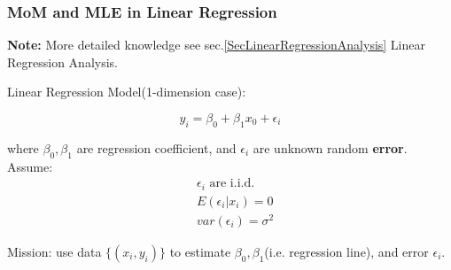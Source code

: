 \subsubsection{MoM and MLE in Linear Regression}\label{SubSectionMoM_MLE_LinearRegression}
    \textbf{Note:} More detailed knowledge see sec.\ref{SecLinearRegressionAnalysis} Linear Regression Analysis.

\begin{point}
    Linear Regression Model(1-dimension case):
\end{point}

    \[
        y_i=\beta_0+\beta_1x_0+\epsilon_i    
    \]

    where $\beta_0,\beta_1$ are regression coefficient, and $\epsilon_i$ are unknown random \textbf{error}. Assume:
    \begin{align*}
        &\epsilon_i\text{ are i.i.d.}\\
        &E(\epsilon_i|x_i)=0\\
        &var(\epsilon_i)=\sigma^2
    \end{align*}

    Mission: use data $\{(x_i,y_i)\}$ to estimate $\beta_0,\beta_1$(i.e. regression line), and error $\epsilon_i$.

